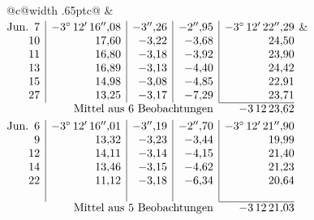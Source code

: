\noindent\begin{tabular}{@{}c@{\hspace{.4em}\vrule width .65pt\hspace{.4em}}c@{}}
 &
 \\[.18ex]
\(\begin{array}[t]{@{}r|r|r|r|r@{}}
\text{Jun.}\enspace 7 & -3^\circ\,12'\,16''{,}08 & -3''{,}26 & -2''{,}95 & -3^\circ\,12'\,22''{,}29\\
10 & 17{,}60 & -3{,}22 & -3{,}68 & 24{,}50\\
11 & 16{,}80 & -3{,}18 & -3{,}92 & 23{,}90\\
13 & 16{,}89 & -3{,}13 & -4{,}40 & 24{,}42\\
15 & 14{,}98 & -3{,}08 & -4{,}85 & 22{,}91\\
27 & 13{,}25 & -3{,}17 & -7{,}29 & 23{,}71\\
\cline{5-5}
\multicolumn{4}{r}{\text{Mittel aus 6 Beobachtungen}} & -3\,12\,23{,}62
\end{array}\)
&
\(\begin{array}[t]{@{}r|r|r|r|r@{}}
\text{Jun.}\enspace 6 & -3^\circ\,12'\,16''{,}01 & -3''{,}19 & -2''{,}70 & -3^\circ\,12'\,21''{,}90\\
9 & 13{,}32 & -3{,}23 & -3{,}44 & 19{,}99\\
12 & 14{,}11 & -3{,}14 & -4{,}15 & 21{,}40\\
14 & 13{,}46 & -3{,}15 & -4{,}62 & 21{,}23\\
22 & 11{,}12 & -3{,}18 & -6{,}34 & 20{,}64\\
 & & & & \\
\cline{5-5}
\multicolumn{4}{r}{\text{Mittel aus 5 Beobachtungen}} & -3\,12\,21{,}03
\end{array}\)
\end{tabular}\par\medskip
{}
